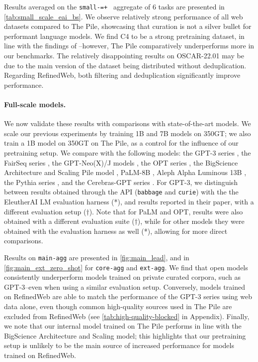 Results averaged on the \texttt{small-=+
} aggregate of 6 tasks are presented in \ref{tab:small_scale_eai_bs}. We observe relatively strong performance of all web datasets compared to The Pile, showcasing that curation is not a silver bullet for performant language models. We find C4 to be a strong pretraining dataset, in line with the findings of \citet{scao2022language}--however, The Pile comparatively underperforms more in our benchmarks. The relatively disappointing results on OSCAR-22.01 may be due to the main version of the dataset being distributed without deduplication. Regarding RefinedWeb, both filtering and deduplication significantly improve performance. 

\paragraph{Full-scale models.} We now validate these results with comparisons with state-of-the-art models. We scale our previous experiments by training 1B and 7B models on 350GT; we also train a 1B model on 350GT on The Pile, as a control for the influence of our pretraining setup. We compare with the following models: the GPT-3 series \cite{brown2020language}, the FairSeq series \cite{artetxe2021efficient}, the GPT-Neo(X)/J models \cite{gpt-neo, gpt-j, black2022gpt}, the OPT series \cite{zhang2022opt}, the BigScience Architecture and Scaling Pile model \cite{scao2022language}, PaLM-8B \cite{chowdhery2022palm},  Aleph Alpha Luminous 13B \cite{alephalpha}, the Pythia series \cite{biderman2023pythia}, and the Cerebras-GPT series \cite{dey2023cerebras}. For GPT-3, we distinguish between results obtained through the API (\texttt{babbage} and \texttt{curie}) with the the EleutherAI LM evaluation harness \cite{gao2021eval} (*), and results reported in their paper, with a different evaluation setup ($\dagger$). Note that for PaLM and OPT, results were also obtained with a different evaluation suite ($\dagger$), while for other models they were obtained with the evaluation harness as well (*), allowing for more direct comparisons. 

Results on \texttt{main-agg} are presented in \ref{fig:main_lead}, and in \ref{fig:main_ext_zero_shot} for \texttt{core-agg} and \texttt{ext-agg}. We find that open models consistently underperform models trained on private curated corpora, such as GPT-3--even when using a similar evaluation setup. Conversely, models trained on RefinedWeb are able to match the performance of the GPT-3 series using web data alone, even though common high-quality sources used in The Pile are excluded from RefinedWeb (see \ref{tab:high-quality-blocked} in Appendix). Finally, we note that our internal model trained on The Pile performs in line with the BigScience Architecture and Scaling model; this highlights that our pretraining setup is unlikely to be the main source of increased performance for models trained on RefinedWeb.

